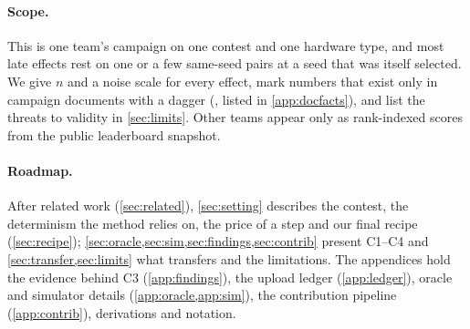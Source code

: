 \paragraph{Scope.} This is one team's campaign on one contest and one hardware type, and most late effects rest on
one or a few same-seed pairs at a seed that was itself selected. We give $n$ and a noise scale for every effect, mark
numbers that exist only in campaign documents with a dagger (\docnum{}, listed in \cref{app:docfacts}), and list the
threats to validity in \cref{sec:limits}. Other teams appear only as rank-indexed scores from the public leaderboard
snapshot.

\paragraph{Roadmap.} After related work (\cref{sec:related}), \cref{sec:setting} describes the contest, the
determinism the method relies on, the price of a step and our final recipe (\cref{sec:recipe}); \cref{sec:oracle,sec:sim,sec:findings,sec:contrib}
present C1--C4 and \cref{sec:transfer,sec:limits} what transfers and the limitations. The appendices hold the
evidence behind C3 (\cref{app:findings}), the upload ledger (\cref{app:ledger}), oracle and simulator details
(\cref{app:oracle,app:sim}), the contribution pipeline (\cref{app:contrib}), derivations and notation.
